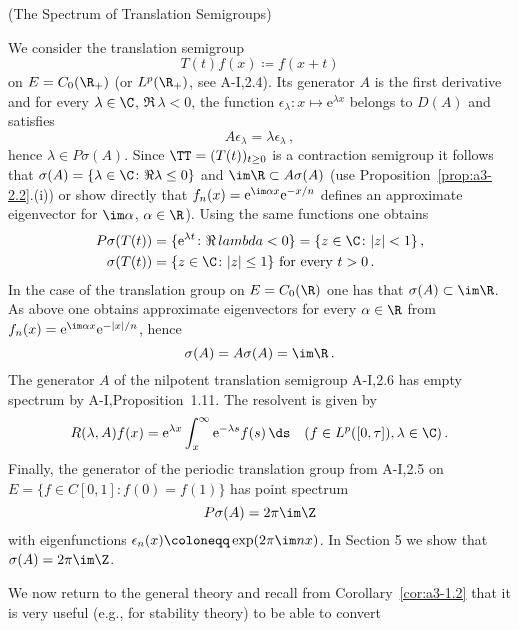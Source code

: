 \begin{example}{(The Spectrum of Translation Semigroups)}\label{ex:a3-2.4}

We consider the translation semigroup
\[
T(t)f(x) \coloneqq f(x+t)
\]
on $E = C_{0}(\R_{+})$ (or $L^{p}(\R_{+})$, see A-I,2.4).
Its generator $A$ is the first derivative and for every $\lambda \in \C$, $\Re\,\lambda < 0$, the function $\epsilon_{\lambda} \colon x \mapsto \mathrm{e}^{\lambda x}$ belongs to $D(A)$ and satisfies
\[
A\epsilon_{\lambda} = \lambda\epsilon_{\lambda}\,,
\]
hence $\lambda \in P\sigma(A)$.
Since $\TT = (T(t))_{t \geq 0}$ is a contraction semigroup it follows that $\sigma(A) = \{\lambda \in \C \colon 
\Re\lambda \leq 0\}$ and $\im\R \subset A\sigma(A)$ (use Proposition~\ref{prop:a3-2.2}.(i)) or show directly that $f_{n}(x) = \mathrm{e}^{ \im\alpha x}\mathrm{e}^{-x/n}$ defines an approximate eigenvector for $\im\alpha$, $\alpha \in \R$).
Using the same functions one obtains
\begin{align*}
	P\sigma(T(t)) &= \{\mathrm{e}^{\lambda t} \colon \Re\,lambda < 0\} = \{z \in \C \colon |z| < 1\}\,,\\
	\sigma(T(t)) &= \{z \in \C \colon |z| \leq 1\} \text{ for every } t > 0\,.
\end{align*}
In the case of the translation group on $E = C_{0}(\R)$ one has that $\sigma(A) \subset \im\R$.
As above one obtains approximate eigenvectors for every $\alpha \in \R$ from 
$f_{n}(x) = \mathrm{e}^{\im\alpha x}\mathrm{e}^{-|x|/n}$, hence
\[
\sigma(A) = A\sigma(A) = \im\R\,.
\]
The generator $A$ of the nilpotent translation semigroup A-I,2.6 has empty spectrum by A-I,Proposition~1.11.
The resolvent is given by
\[
R(\lambda,A)f(x) = \mathrm{e}^{\lambda x}\int_{x}^{\infty}\mathrm{e}^{-\lambda s}f(s) \, \ds \quad (f \in L^{p}([0,\tau]), \lambda \in \C)\,.
\]
Finally, the generator of the periodic translation group from A-I,2.5 on
\\
$E = \{f \in C[0,1] \colon f(0) = f(1)\}$ has point spectrum
\[
P\sigma(A) = 2\pi \im\Z
\]
with eigenfunctions $\epsilon_{n}(x) \coloneqq \exp(2\pi \im n x)$.
In Section 5 we show that $\sigma(A) = 2\pi \im\Z$.
\end{example}
We now return to the general theory and recall from Corollary~\ref{cor:a3-1.2} that it is very useful (e.g., for stability theory) to be able to convert
